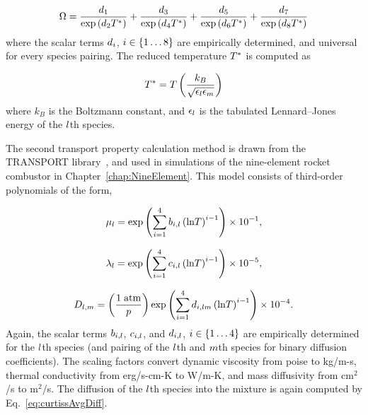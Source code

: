 \begin{equation}
	\Omega = \frac{d_{1}}{\text{exp} \left(d_{2} T^*\right)} + \frac{d_{3}}{\text{exp} \left(d_{4} T^*\right)} + \frac{d_{5}}{\text{exp} \left(d_{6} T^*\right)} + \frac{d_{7}}{\text{exp} \left(d_{8} T^*\right)}
\end{equation}
where the scalar terms $d_{i}$, $i \in \{1 \hdots 8\}$ are empirically determined, and universal for every species pairing. The reduced temperature $T^*$ is computed as

\begin{equation}
	T^* = T \left( \frac{k_B}{\sqrt{\epsilon_{l} \epsilon_{m}}} \right)
\end{equation}
where $k_B$ is the Boltzmann constant, and $\epsilon_{l}$ is the tabulated Lennard--Jones energy of the $l$th species.

The second transport property calculation method is drawn from the TRANSPORT library~\cite{Kee1998}, and used in simulations of the nine-element rocket combustor in Chapter~\ref{chap:NineElement}. This model consists of third-order polynomials of the form,

\begin{equation}
	\mu_{l} = \text{exp} \left( \sum_{i=1}^4 b_{i,l} \left(\text{ln}T\right)^{i - 1} \right) \times 10^{-1},
\end{equation}

\begin{equation}
	\lambda_{l} = \text{exp} \left( \sum_{i=1}^4 c_{i,l} \left(\text{ln}T\right)^{i - 1} \right) \times 10^{-5},
\end{equation}

\begin{equation}
	D_{l, m} = \left(\frac{1 \; \text{atm}}{p}\right) \text{exp} \left( \sum_{i=1}^4 d_{i,l m} \left(\text{ln}T\right)^{i - 1} \right) \times 10^{-4}.
\end{equation}
Again, the scalar terms $b_{i,l}$, $c_{i,l}$, and $d_{i,l}$, $i \in \{1 \hdots 4\}$ are empirically determined for the $l$th species (and pairing of the $l$th and $m$th species for binary diffusion coefficients). The scaling factors convert dynamic viscosity from poise to kg/m-s, thermal conductivity from erg/s-cm-K to W/m-K, and mass diffusivity from cm$^2$/s to m$^2$/s. The diffusion of the $l$th species into the mixture is again computed by Eq.~\ref{eq:curtissAvgDiff}.


